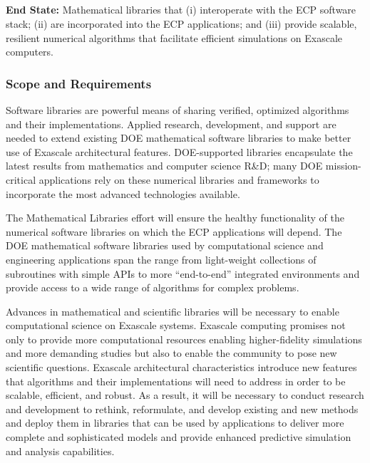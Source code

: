 \subsection{ \mathlibs}\label{subsect:mathlibs}

\textbf{End State:} Mathematical libraries that (i) interoperate with the ECP software stack; (ii) are incorporated into the ECP applications; and (iii) provide scalable, resilient numerical algorithms that facilitate efficient simulations on Exascale computers.

\subsubsection{Scope and Requirements}
Software libraries are powerful means of sharing verified, optimized algorithms and their implementations. Applied research, development, and support are needed to extend existing DOE mathematical software libraries to make better use of Exascale architectural features. DOE-supported libraries encapsulate the latest results from mathematics and computer science R\&D; many DOE mission-critical applications rely on these numerical libraries and frameworks to incorporate the most advanced technologies available. 

The Mathematical Libraries effort will ensure the healthy functionality of the numerical software libraries on which the ECP applications will depend. The DOE mathematical software libraries used by computational science and engineering applications span the range from light-weight collections of subroutines with simple APIs to more “end-to-end” integrated environments and provide access to a wide range of algorithms for complex problems.

Advances in mathematical and scientific libraries will be necessary to enable computational science on Exascale systems. Exascale computing promises not only to provide more computational resources enabling higher-fidelity simulations and more demanding studies but also to enable the community to pose new scientific questions. Exascale architectural characteristics introduce new features that algorithms and their implementations will need to address in order to be scalable, efficient, and robust. As a result, it will be necessary to conduct research and development to rethink, reformulate, and develop existing and new methods and deploy them in libraries that can be used by applications to deliver more complete and sophisticated models and provide enhanced predictive simulation and analysis capabilities.

